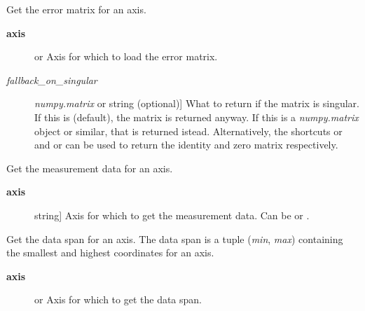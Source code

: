 \documentclass[a4paper,10pt,english]{sphinxmanual}
\begin{document}
\begin{fulllineitems}

\begin{fulllineitems}
\label{index:kafe.dataset.Dataset.get_cov_mat}
Get the error matrix for an axis.
\begin{description}
\item[{\textbf{axis}}] \leavevmode{[} or \code{'y'}{]}
Axis for which to load the error matrix.

\item[{\emph{fallback\_on\_singular}}] \leavevmode{[}\emph{numpy.matrix} or string (optional){]}
What to return if the matrix is singular. If this is 
(default), the matrix is returned anyway. If this is a
\emph{numpy.matrix} object or similar, that is returned istead.
Alternatively, the shortcuts  or  and 
or  can be used to return the identity and zero matrix
respectively.

\end{description}

\end{fulllineitems}


\begin{fulllineitems}
\label{index:kafe.dataset.Dataset.get_data}
Get the measurement data for an axis.
\begin{description}
\item[{\textbf{axis}}] \leavevmode{[}string{]}
Axis for which to get the measurement data. Can be  or
.

\end{description}

\end{fulllineitems}


\begin{fulllineitems}
\label{index:kafe.dataset.Dataset.get_data_span}
Get the data span for an axis. The data span is a tuple (\emph{min}, \emph{max})
containing the smallest and highest coordinates for an axis.
\begin{description}
\item[{\textbf{axis}}] \leavevmode{[} or \code{'y'}{]}
Axis for which to get the data span.


\end{description}
\end{fulllineitems}
\end{fulllineitems}
\end{document}
